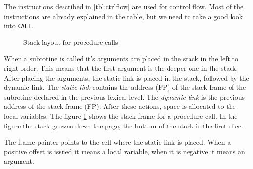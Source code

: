 \documentclass[a4paper, 11pt]{report}
\newcommand{\keyword}[1]{\texttt{#1}}
\begin{document}
The instructions described in \ref{tbl:ctrlflow} are used for control flow. Most of the
instructions are already explained in the table, but we need to take a good look into
\keyword{CALL}.


\begin{figure}[htp]
\caption{Stack layout for procedure calls}
\label{fig:proc}
\end{figure}

When a subrotine is called it's arguments are placed in the stack in the left to right order.
This means that the first argument is the deeper one in the stack. After placing the arguments,
the static link is placed in the stack, followed by the dynamic link. The \emph{static link}
contains the address (FP) of the stack frame of the subrotine declared in the previous lexical level.
The \emph{dynamic link} is the previous address of the stack frame (FP). After these actions, space
is allocated to the local variables. The figure \ref{fig:proc} shows the stack frame for a procedure
call. In the figure the stack growns down the page, the bottom of the stack is the first slice.

The frame pointer points to the cell where the static link is placed. When a positive offset is
issued it means a local variable, when it is negative it means an argument.
\end{document}
